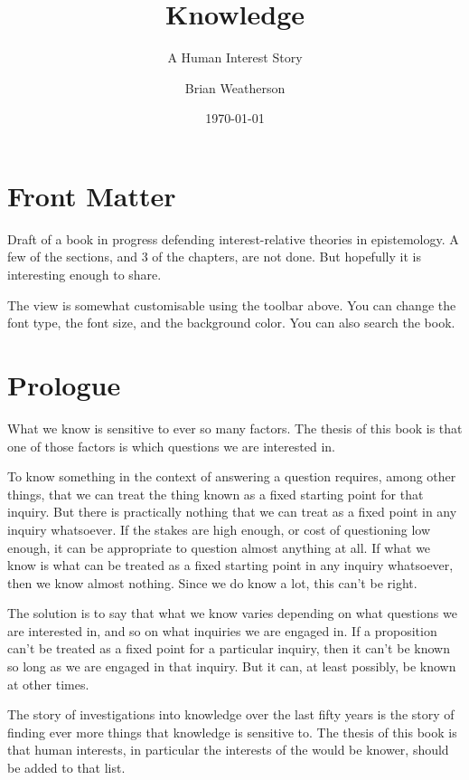 \documentclass[11pt,]{book}
\title{Knowledge}
\subtitle{A Human Interest Story}
\author{Brian Weatherson}
\date{\today}
\begin{document}
\maketitle

{
\setcounter{tocdepth}{1}
\tableofcontents
}
\hypertarget{front-matter}{%
\chapter*{Front Matter}\label{front-matter}}

Draft of a book in progress defending interest-relative theories in epistemology. A few of the sections, and 3 of the chapters, are not done. But hopefully it is interesting enough to share.

The view is somewhat customisable using the toolbar above. You can change the font type, the font size, and the background color. You can also search the book.

\hypertarget{prologue}{%
\chapter{Prologue}\label{prologue}}

What we know is sensitive to ever so many factors. The thesis of this book is that one of those factors is which questions we are interested in.

To know something in the context of answering a question requires, among other things, that we can treat the thing known as a fixed starting point for that inquiry. But there is practically nothing that we can treat as a fixed point in any inquiry whatsoever. If the stakes are high enough, or cost of questioning low enough, it can be appropriate to question almost anything at all. If what we know is what can be treated as a fixed starting point in any inquiry whatsoever, then we know almost nothing. Since we do know a lot, this can't be right.

The solution is to say that what we know varies depending on what questions we are interested in, and so on what inquiries we are engaged in. If a proposition can't be treated as a fixed point for a particular inquiry, then it can't be known so long as we are engaged in that inquiry. But it can, at least possibly, be known at other times.

The story of investigations into knowledge over the last fifty years is the story of finding ever more things that knowledge is sensitive to. The thesis of this book is that human interests, in particular the interests of the would be knower, should be added to that list.
\end{document}
